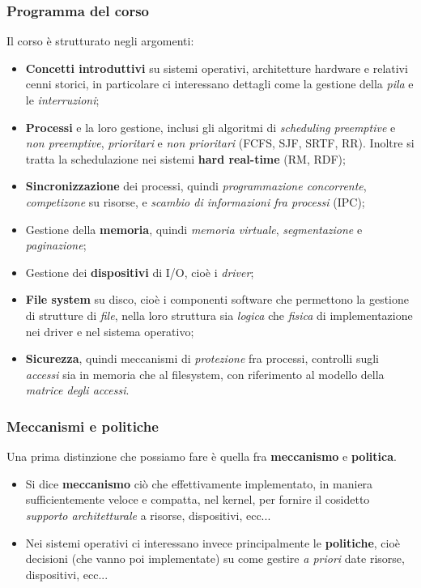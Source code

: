 \documentclass[a4paper,11pt]{article}
\begin{document}
\subsubsection{Programma del corso}
Il corso è strutturato negli argomenti: 
\begin{itemize}
	\item \textbf{Concetti introduttivi} su sistemi operativi, architetture hardware e relativi cenni storici, in particolare ci interessano dettagli come la gestione della \textit{pila} e le \textit{interruzioni};
	\item \textbf{Processi} e la loro gestione, inclusi gli algoritmi di \textit{scheduling} \textit{preemptive} e \textit{non preemptive}, \textit{prioritari} e \textit{non prioritari} (FCFS, SJF, SRTF, RR). Inoltre si tratta la schedulazione nei sistemi \textbf{hard real-time} (RM, RDF);
	\item \textbf{Sincronizzazione} dei processi, quindi \textit{programmazione concorrente}, \textit{competizone} su risorse, e \textit{scambio di informazioni fra processi} (IPC);
	\item Gestione della \textbf{memoria}, quindi \textit{memoria virtuale}, \textit{segmentazione} e \textit{paginazione};
	\item Gestione dei \textbf{dispositivi} di I/O, cioè i \textit{driver};
	\item \textbf{File system} su disco, cioè i componenti software che permettono la gestione di strutture di \textit{file}, nella loro struttura sia \textit{logica} che \textit{fisica} di implementazione nei driver e nel sistema operativo;
	\item \textbf{Sicurezza}, quindi meccanismi di \textit{protezione} fra processi, controlli sugli \textit{accessi} sia in memoria che al filesystem, con riferimento al modello della \textit{matrice degli accessi}.
\end{itemize}

\subsubsection{Meccanismi e politiche}
Una prima distinzione che possiamo fare è quella fra \textbf{meccanismo} e \textbf{politica}.
\begin{itemize}
	\item Si dice \textbf{meccanismo} ciò che effettivamente implementato, in maniera sufficientemente veloce e compatta, nel kernel, per fornire il cosidetto \textit{supporto architetturale} a risorse, dispositivi, ecc...
	\item Nei sistemi operativi ci interessano invece principalmente le \textbf{politiche}, cioè decisioni (che vanno poi implementate) su come gestire \textit{a priori} date risorse, dispositivi, ecc...
\end{itemize}
\end{document}
